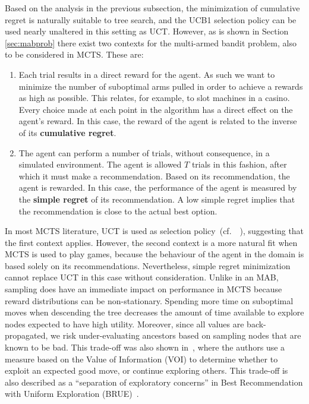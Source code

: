 \documentclass{kecsmstr}
\newcommand{\cf}{{cf.}~}
\begin{document}
Based on the analysis in the previous subsection, the minimization of cumulative regret is naturally suitable to tree search, and the UCB1 selection policy can be used nearly unaltered in this setting as UCT. However, as is shown in Section \ref{sec:mabprob} there exist two contexts for the multi-armed bandit problem, also to be considered in MCTS. These are:

\begin{enumerate}

\item Each trial results in a direct reward for the agent. As such we want to minimize the number of suboptimal arms pulled in order to achieve a rewards as high as possible. This relates, for example, to slot machines in a casino. Every choice made at each point in the algorithm has a direct effect on the agent's reward. In this case, the reward of the agent is related to the inverse of its \textbf{cumulative regret}.

\item The agent can perform a number of trials, without consequence, in a simulated environment. The agent is allowed $T$ trials in this fashion, after which it must make a recommendation. Based on its recommendation, the agent is rewarded. In this case, the performance of the agent is measured by the \textbf{simple regret} of its recommendation. A low simple regret implies that the recommendation is close to the actual best option.

\end{enumerate}

In most MCTS literature, UCT is used as selection policy~(\cf~), suggesting that the first context applies. However, the second context is a more natural fit when MCTS is used to play games, because the behaviour of the agent in the domain is based solely on its recommendations. Nevertheless, simple regret minimization cannot replace UCT in this case without consideration. Unlike in an MAB, sampling does have an immediate impact on performance in MCTS because reward distributions can be non-stationary. 
Spending more time on suboptimal moves when descending the tree decreases the amount of time available to explore nodes expected to have high utility. Moreover, since all values are back-propagated, we risk under-evaluating ancestors based on sampling nodes that are known to be bad. This trade-off was also shown in~, where the authors use a measure based on the Value of Information (VOI) to determine whether to exploit an expected good move, or continue exploring others. This trade-off is also described as a ``separation of exploratory concerns'' in Best Recommendation with Uniform Exploration (BRUE)~.
\end{document}
